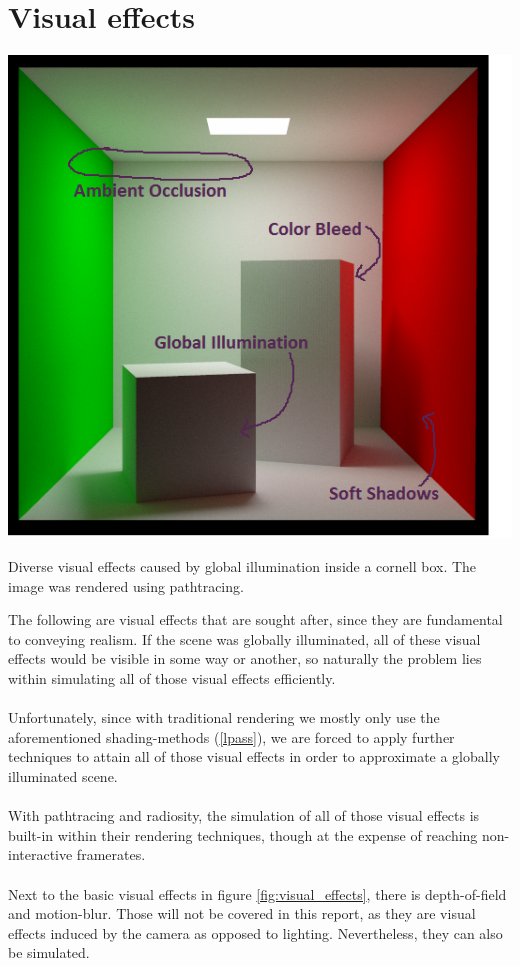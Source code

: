 \documentclass{ACGSeminar}
\begin{document}
\section{Visual effects} 
	\begin{floatingfigure}[l]{.5\textwidth} %
		\includegraphics[width=.5\textwidth]{img/visual_effects.png} %
			
		\caption{Diverse visual effects caused by global illumination inside a cornell box. The image was rendered using pathtracing.}%
		\label{fig:visual_effects}%
	\end{floatingfigure} %

	The following are visual effects that are sought after, since they are fundamental to conveying realism. If the scene was globally illuminated, all of these visual effects would be visible in some way or another, so naturally the problem lies within simulating all of those visual effects efficiently. \\\\
	Unfortunately, since with traditional rendering we mostly only use the aforementioned shading-methods (\ref{lpass}), we are forced to apply further techniques to attain all of those visual effects in order to approximate a globally illuminated scene. \\\\
	With pathtracing and radiosity, the simulation of all of those visual effects is built-in within their rendering techniques, though at the expense of reaching non-interactive framerates. \\\\
	Next to the basic visual effects in figure \ref{fig:visual_effects}, there is depth-of-field and motion-blur. Those will not be covered in this report, as they are visual effects induced by the camera as opposed to lighting. Nevertheless, they can also be simulated.
\end{document}
